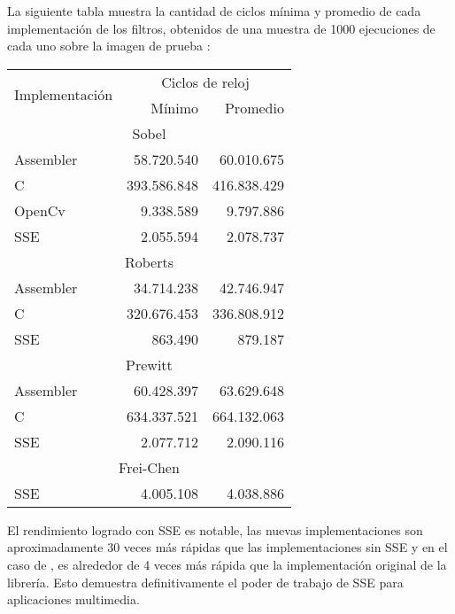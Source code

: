 La siguiente tabla muestra la cantidad de ciclos mínima y promedio de cada implementación de los filtros, obtenidos de una muestra de
1000 ejecuciones de cada uno sobre la imagen de prueba :
\begin{center}
\begin{tabular}{|l|r|r|}
\hline
\multirow{2}{*}{Implementación}&\multicolumn{2}{|c|}{Ciclos de reloj} \\
\cline{2-3}
&Mínimo	&	Promedio \\
\hline
\multicolumn{3}{|c|}{Sobel}\\
\hline
Assembler	&	58.720.540	&	60.010.675 \\
\hline
C		&	393.586.848	&	416.838.429 \\
\hline
OpenCv		&	9.338.589	& 	9.797.886 \\
\hline
SSE		&	2.055.594 	&	2.078.737 \\
\hline
\multicolumn{3}{|c|}{Roberts}\\
\hline
Assembler	&	34.714.238	&	42.746.947 \\
\hline
C		&	320.676.453	&	336.808.912 \\
\hline
SSE		&	863.490		&	879.187 \\
\hline
\multicolumn{3}{|c|}{Prewitt}\\
\hline
Assembler	&	60.428.397	&	63.629.648 \\
\hline
C		&	634.337.521	&	664.132.063 \\
\hline
SSE		&	2.077.712	&	2.090.116 \\
\hline
\multicolumn{3}{|c|}{Frei-Chen}\\
\hline
SSE		&	4.005.108	&	4.038.886 \\
\hline
\end{tabular}
\end{center}

El rendimiento logrado con SSE es notable, las nuevas implementaciones son aproximadamente 30 veces más rápidas que las implementaciones sin SSE y en el 
caso de , es alrededor de 4 veces más rápida que la implementación original de la librería. Esto demuestra definitivamente el poder de 
trabajo de SSE para aplicaciones multimedia.

\pagebreak

